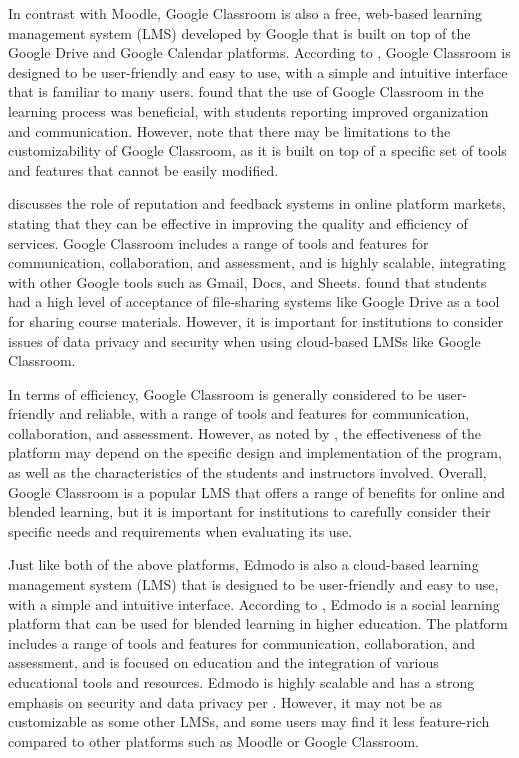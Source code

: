 \begin{justify}
\vspace{0.25cm}
\newendline In contrast with Moodle, Google Classroom is also a free, web-based learning management system (LMS) developed by Google that is built on top of the Google Drive and Google Calendar platforms. According to \cite{iftakhar2016google}, Google Classroom is designed to be user-friendly and easy to use, with a simple and intuitive interface that is familiar to many users. \cite{sudarsana2019use} found that the use of Google Classroom in the learning process was beneficial, with students reporting improved organization and communication. However, \cite{mohd2016application} note that there may be limitations to the customizability of Google Classroom, as it is built on top of a specific set of tools and features that cannot be easily modified.

\vspace{0.25cm}
\newendline \cite{tadelis2016reputation} discusses the role of reputation and feedback systems in online platform markets, stating that they can be effective in improving the quality and efficiency of services. Google Classroom includes a range of tools and features for communication, collaboration, and assessment, and is highly scalable, integrating with other Google tools such as Gmail, Docs, and Sheets. \cite{sadik2017students} found that students had a high level of acceptance of file-sharing systems like Google Drive as a tool for sharing course materials. However, it is important for institutions to consider issues of data privacy and security when using cloud-based LMSs like Google Classroom.

\vspace{0.25cm}
\newendline In terms of efficiency, Google Classroom is generally considered to be user-friendly and reliable, with a range of tools and features for communication, collaboration, and assessment. However, as noted by \cite{mohd2016application}, the effectiveness of the platform may depend on the specific design and implementation of the program, as well as the characteristics of the students and instructors involved. Overall, Google Classroom is a popular LMS that offers a range of benefits for online and blended learning, but it is important for institutions to carefully consider their specific needs and requirements when evaluating its use.

\vspace{0.25cm}
\newendline Just like both of the above platforms, Edmodo is also a cloud-based learning management system (LMS) that is designed to be user-friendly and easy to use, with a simple and intuitive interface. According to \cite{dewi2014edmodo}, Edmodo is a social learning platform that can be used for blended learning in higher education. The platform includes a range of tools and features for communication, collaboration, and assessment, and is focused on education and the integration of various educational tools and resources. Edmodo is highly scalable and has a strong emphasis on security and data privacy per \cite{gay2017effectiveness}. However, it may not be as customizable as some other LMSs, and some users may find it less feature-rich compared to other platforms such as Moodle or Google Classroom.


\end{justify}
